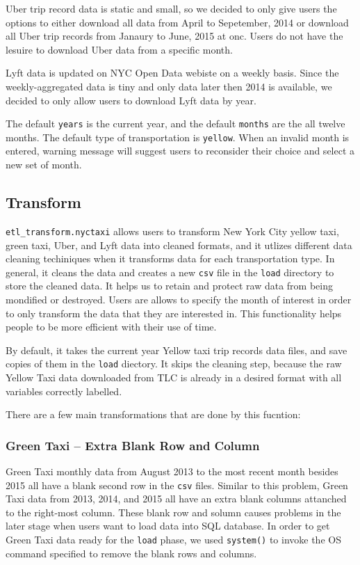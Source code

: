 \documentclass[12pt,twoside]{reedthesis}
\theoremstyle{definition}
\theoremstyle{definition}
\theoremstyle{definition}
\theoremstyle{remark}
\begin{document}
Uber trip record data is static and small, so we decided to only give
users the options to either download all data from April to Sepetember,
2014 or download all Uber trip records from Janaury to June, 2015 at
onc. Users do not have the lesuire to download Uber data from a specific
month.

Lyft data is updated on NYC Open Data webiste on a weekly basis. Since
the weekly-aggregated data is tiny and only data later then 2014 is
available, we decided to only allow users to download Lyft data by year.

The default \texttt{years} is the current year, and the default
\texttt{months} are the all twelve months. The default type of
transportation is \texttt{yellow}. When an invalid month is entered,
warning message will suggest users to reconsider their choice and select
a new set of month.

\subsection{Transform}\label{transform}

\texttt{etl\_transform.nyctaxi} allows users to transform New York City
yellow taxi, green taxi, Uber, and Lyft data into cleaned formats, and
it utlizes different data cleaning techiniques when it transforms data
for each transportation type. In general, it cleans the data and creates
a new \texttt{csv} file in the \texttt{load} directory to store the
cleaned data. It helps us to retain and protect raw data from being
mondified or destroyed. Users are allows to specify the month of
interest in order to only transform the data that they are interested
in. This functionality helps people to be more efficient with their use
of time.

By default, it takes the current year Yellow taxi trip records data
files, and save copies of them in the \texttt{load} diectory. It skips
the cleaning step, because the raw Yellow Taxi data downloaded from TLC
is already in a desired format with all variables correctly labelled.

There are a few main transformations that are done by this fucntion:

\subsubsection{Green Taxi -- Extra Blank Row and
Column}\label{green-taxi-extra-blank-row-and-column}

Green Taxi monthly data from August 2013 to the most recent month
besides 2015 all have a blank second row in the \texttt{csv} files.
Similar to this problem, Green Taxi data from 2013, 2014, and 2015 all
have an extra blank columns attanched to the right-most column. These
blank row and solumn causes problems in the later stage when users want
to load data into SQL database. In order to get Green Taxi data ready
for the \texttt{load} phase, we used \texttt{system()} to invoke the OS
command specified to remove the blank rows and columns.
\end{document}
